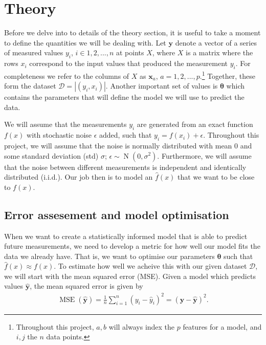 \documentclass[twocolumn,english,notitlepage]{article}
\renewcommand{\vec}[1]{\boldsymbol{#1}}
\newcommand{\vclosed}[1]{\left|#1\right|}
\DeclareMathOperator{\mse}{\operatorname{MSE}}
\begin{document}
\section{Theory}
    Before we delve into to details of the theory section, it is useful to take a moment to define the quantities we will be dealing with. Let $\vec{y}$ denote a vector of a series of measured values $y_i$, $i\in 1, 2,..., n$ at points $X$, where $X$ is a matrix where the rows $x_i$ correspond to the input values that produced the measurement $y_i$. For completeness we refer to the columns of $X$ as $\vec{x}_a$, $a=1, 2,..., p$.\footnote{Throughout this project, $a, b$ will always index the $p$ features for a model, and $i, j$ the $n$ data points.} Together, these form the dataset $\mathcal{D} = \vclosed{(y_i, x_i)}$. Another important set of values is $\vec{\theta}$ which contains the parameters that will define the model we will use to predict the data.

    We will assume that the measurements $y_i$ are generated from an exact function $f(x)$ with stochastic noise $\epsilon$ added, such that $y_i = f(x_i) + \epsilon$. Throughout this project, we will assume that the noise is normally distributed with mean 0 and some standard deviation (std) $\sigma$; $\epsilon \sim \operatorname{N}(0,\sigma^2)$. Furthermore, we will assume that the noise between different measurements is independent and identically distributed (i.i.d.). Our job then is to model an $\hat{f}(x)$ that we want to be close to $f(x)$.

    \subsection{Error assesement and model optimisation}
        When we want to create a statistically informed model that is able to predict future measurements, we need to develop a metric for how well our model fits the data we already have. That is, we want to optimise our parameters $\vec{\theta}$ such that $\hat{f}(x) \approx f(x)$. To estimate how well we acheive this with our given dataset $\mathcal{D}$, we will start with the mean squared error (MSE). Given a model which predicts values $\vec{\hat{y}}$, the mean squared error is given by
        \begin{align}
            \boxed{
                \mse(\vec{\hat{y}}) = \frac{1}{n} \sum_{i=1}^n (y_i-\hat{y}_i)^2 = (\vec{y} - \vec{\hat{y}})^2.
            }
        \end{align}
        
\end{document}
